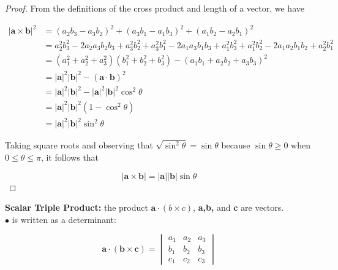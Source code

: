         \begin{proof}
            From the definitions of the cross product and length of a vector, we have

            \begin{align*}
                |\mathbf{a\times b}|^2  &= (a_2 b_3 - a_3 b_2)^2 + (a_3 b_1 - a_1 b_3)^2 + (a_1 b_2 - a_2 b_1)^2 \\
                                        &= a^2_2 b^2_3 - 2a_2 a_3 b_2 b_3 + a^2_3 b^2_2 + a^2_3 b^2_1 - 2a_1 a_3 b_1 b_3 + a^2_1 b^2_3 + a^2_1 b^2_2 - 2a_1 a_2 b_1 b_2 + a^2_2 b^2_1 \\
                                        &= \left(a^2_1 + a^2_2 + a^2_3\right)\left(b^2_1 + b^2_2 + b^2_3\right) - \left(a_1 b_1 + a_2 b_2 + a_3 b_3\right)^2 \\
                                        &= |\mathbf{a}|^2 |\mathbf{b}|^2 - \left(\mathbf{a\cdot b}\right)^2 \\
                                        &= |\mathbf{a}|^2 |\mathbf{b}|^2 - |\mathbf{a}|^2 |\mathbf{b}|^2 \cos^2{\theta} \\
                                        &= |\mathbf{a}|^2 |\mathbf{b}|^2 (1-\cos^2{\theta}) \\
                                        &= |\mathbf{a}|^2 |\mathbf{b}|^2 \sin^2{\theta}
            \end{align*}

            Taking square roots and observing that $\sqrt{\sin^2{\theta}} = \sin{\theta}$ because $\sin{\theta} \geq 0$ when $0 \leq \theta \leq \pi$, it follows that

            \[
                |\mathbf{a\times b}| = |\mathbf{a}||\mathbf{b}|\sin{\theta}
            \]
        \end{proof}

            \textbf{Scalar Triple Product:} the product $\mathbf{a}\cdot (b\times c)$, \textbf{a,b,} and \textbf{c} are vectors. \\
            $\bullet$ is written as a determinant:

            \[
                \mathbf{a\cdot (b\times c)} =
                \begin{vmatrix}
                    a_1 & a_2 & a_3 \\
                    b_1 & b_2 & b_3 \\
                    c_1 & c_2 & c_3
                \end{vmatrix}
            \]

